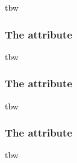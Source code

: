 tbw

\subsubsection{The  attribute}
\label{sec:outputStartTime}

tbw

\subsubsection{The  attribute}
\label{sec:outputEndTime}

tbw


\subsubsection{The  attribute}
\label{sec:numberOfPoints}

tbw




